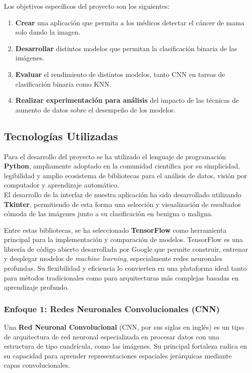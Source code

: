 \documentclass[12pt]{article} %
\begin{document}
Los objetivos específicos del proyecto son los siguientes:\\

\begin{enumerate}
    \item \textbf{Crear} una aplicación que permita a los médicos detectar el cáncer de mama solo dando la imagen.
    \item \textbf{Desarrollar} distintos modelos que permitan la clasificación binaria de las imágenes.
    \item \textbf{Evaluar} el rendimiento de distintos modelos, tanto CNN en tareas de clasificación binaria como KNN.
    \item \textbf{Realizar experimentación para análisis} del  impacto de las técnicas de aumento de datos sobre el desempeño de los modelos.
\end{enumerate}

\subsection{Tecnologías Utilizadas}
Para el desarrollo del proyecto se ha utilizado el lenguaje de programación \textbf{Python}, ampliamente adoptado en la comunidad científica por su simplicidad, legibilidad y amplio ecosistema de bibliotecas para el análisis de datos, visión por computador y aprendizaje automático.\\

El desarrollo de la interfaz de nuestra aplicación ha sido desarrollado utilizando \textbf{Tkinter}, permitiendo de esta forma una selección y visualización de resultados cómoda de las imágenes junto a su clasificación en benigna o maligna.

Entre estas bibliotecas, se ha seleccionado \textbf{TensorFlow} como herramienta principal para la implementación y comparación de modelos. TensorFlow es una librería de código abierto desarrollada por Google que permite construir, entrenar y desplegar modelos de \textit{machine learning}, especialmente redes neuronales profundas. Su flexibilidad y eficiencia lo convierten en una plataforma ideal tanto para métodos tradicionales como para arquitecturas más complejas basadas en aprendizaje profundo.\\

\subsubsection{Enfoque 1: Redes Neuronales Convolucionales (CNN)}
Una \textbf{Red Neuronal Convolucional} (CNN, por sus siglas en inglés) es un tipo de arquitectura de red neuronal especializada en procesar datos con una estructura de tipo cuadrícula, como las imágenes. Su principal fortaleza radica en su capacidad para aprender representaciones espaciales jerárquicas mediante capas convolucionales.\\
\end{document}
